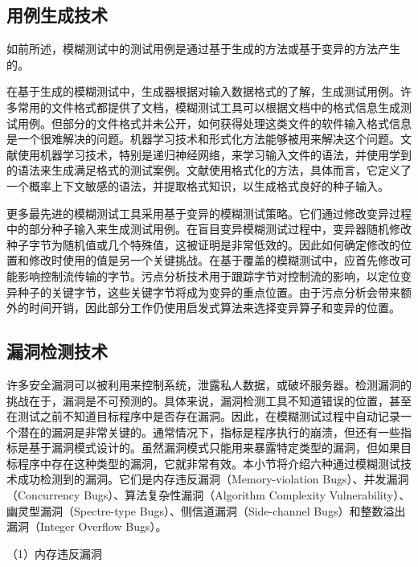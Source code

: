 \documentclass[master]{thesis-uestc}
\begin{document}
\subsection{用例生成技术}

如前所述，模糊测试中的测试用例是通过基于生成的方法或基于变异的方法产生的。

在基于生成的模糊测试中，生成器根据对输入数据格式的了解，生成测试用例。许多常用的文件格式都提供了文档，模糊测试工具可以根据文档中的格式信息生成测试用例。但部分的文件格式并未公开，如何获得处理这类文件的软件输入格式信息是一个很难解决的问题。机器学习技术和形式化方法能够被用来解决这个问题。文献\cite{godefroid2017learn}使用机器学习技术，特别是递归神经网络，来学习输入文件的语法，并使用学到的语法来生成满足格式的测试案例。文献\cite{wang2017skyfire}使用格式化的方法，具体而言，它定义了一个概率上下文敏感的语法，并提取格式知识，以生成格式良好的种子输入。

更多最先进的模糊测试工具采用基于变异的模糊测试策略。它们通过修改变异过程中的部分种子输入来生成测试用例。在盲目变异模糊测试过程中，变异器随机修改种子字节为随机值或几个特殊值，这被证明是非常低效的。因此如何确定修改的位置和修改时使用的值是另一个关键挑战。在基于覆盖的模糊测试中，应首先修改可能影响控制流传输的字节。污点分析技术用于跟踪字节对控制流的影响，以定位变异种子的关键字节，这些关键字节将成为变异的重点位置。由于污点分析会带来额外的时间开销，因此部分工作仍使用启发式算法来选择变异算子和变异的位置。

\subsection{漏洞检测技术}

许多安全漏洞可以被利用来控制系统，泄露私人数据，或破坏服务器。检测漏洞的挑战在于，漏洞是不可预测的。具体来说，漏洞检测工具不知道错误的位置，甚至在测试之前不知道目标程序中是否存在漏洞。因此，在模糊测试过程中自动记录一个潜在的漏洞是非常关键的。通常情况下，指标是程序执行的崩溃，但还有一些指标是基于漏洞模式设计的。虽然漏洞模式只能用来暴露特定类型的漏洞，但如果目标程序中存在这种类型的漏洞，它就非常有效。本小节将介绍六种通过模糊测试技术成功检测到的漏洞。它们是内存违反漏洞（Memory-violation Bugs）、并发漏洞（Concurrency Bugs）、算法复杂性漏洞（Algorithm Complexity Vulnerability）、幽灵型漏洞（Spectre-type Bugs）、侧信道漏洞（Side-channel Bugs）和整数溢出漏洞（Integer Overflow Bugs）。

（1）内存违反漏洞
\end{document}
